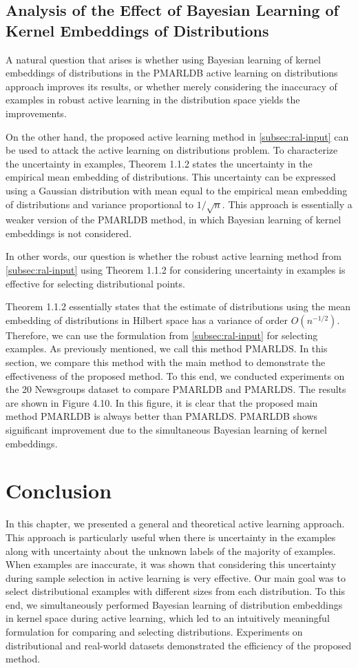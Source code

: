 \documentclass[12pt]{article}
\begin{document}
	\subsection{Analysis of the Effect of Bayesian Learning of Kernel Embeddings of Distributions}
	A natural question that arises is whether using Bayesian learning of kernel embeddings of distributions in the PMARLDB active learning on distributions approach improves its results, or whether merely considering the inaccuracy of examples in robust active learning in the distribution space yields the improvements.
	
	On the other hand, the proposed active learning method in \ref{subsec:ral-input} can be used to attack the active learning on distributions problem. To characterize the uncertainty in examples, Theorem 1.1.2 states the uncertainty in the empirical mean embedding of distributions. This uncertainty can be expressed using a Gaussian distribution with mean equal to the empirical mean embedding of distributions and variance proportional to $1/\sqrt{n}$. This approach is essentially a weaker version of the PMARLDB method, in which Bayesian learning of kernel embeddings is not considered.
	
	In other words, our question is whether the robust active learning method from \ref{subsec:ral-input} using Theorem 1.1.2 for considering uncertainty in examples is effective for selecting distributional points.
	
	Theorem 1.1.2 essentially states that the estimate of distributions using the mean embedding of distributions in Hilbert space has a variance of order $O(n^{-1/2})$. Therefore, we can use the formulation from \ref{subsec:ral-input} for selecting examples. As previously mentioned, we call this method PMARLDS. In this section, we compare this method with the main method to demonstrate the effectiveness of the proposed method. To this end, we conducted experiments on the 20 Newsgroups dataset to compare PMARLDB and PMARLDS. The results are shown in Figure 4.10. In this figure, it is clear that the proposed main method PMARLDB is always better than PMARLDS. PMARLDB shows significant improvement due to the simultaneous Bayesian learning of kernel embeddings.
	
	\section{Conclusion}
	In this chapter, we presented a general and theoretical active learning approach. This approach is particularly useful when there is uncertainty in the examples along with uncertainty about the unknown labels of the majority of examples. When examples are inaccurate, it was shown that considering this uncertainty during sample selection in active learning is very effective. Our main goal was to select distributional examples with different sizes from each distribution. To this end, we simultaneously performed Bayesian learning of distribution embeddings in kernel space during active learning, which led to an intuitively meaningful formulation for comparing and selecting distributions. Experiments on distributional and real-world datasets demonstrated the efficiency of the proposed method.
	
\end{document}
